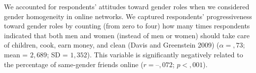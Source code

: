 \documentclass[letterpaper]{article} %
\begin{document}
We accounted for respondents’ attitudes toward gender roles when we considered gender homogeneity in online networks. We captured respondents’ progressiveness toward gender roles by counting (from zero to four) how many times respondents indicated that both men and women (instead of men or women) should take care of children, cook, earn money, and clean (Davis and Greenstein 2009) ($\alpha = ,73$; mean = $2,689$; SD = $1,352$). This variable is significantly negatively related to the percentage of same-gender friends online ($r = –,072$; $p < ,001$).
\end{document}
